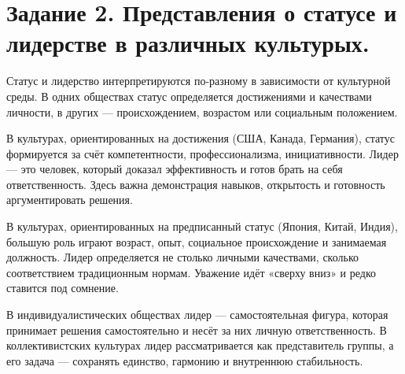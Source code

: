 \documentclass[14pt,a4paper]{extarticle}
\begin{document}
\section{Задание 2. Представления о статусе и лидерстве в различных культурых.}
\begin{sloppypar}
Статус и лидерство интерпретируются по-разному в зависимости от культурной
    среды. В одних обществах статус определяется достижениями и качествами
    личности, в других — происхождением, возрастом или социальным положением.

    В культурах, ориентированных на достижения (США, Канада, Германия), статус
    формируется за счёт компетентности, профессионализма, инициативности. Лидер
    — это человек, который доказал эффективность и готов брать на себя
    ответственность. Здесь важна демонстрация навыков, открытость и готовность
    аргументировать решения.

    В культурах, ориентированных на предписанный статус (Япония, Китай, Индия),
    большую роль играют возраст, опыт, социальное происхождение и занимаемая
    должность. Лидер определяется не столько личными качествами, сколько
    соответствием традиционным нормам. Уважение идёт «сверху вниз» и редко
    ставится под сомнение.

    В индивидуалистических обществах лидер — самостоятельная фигура, которая
    принимает решения самостоятельно и несёт за них личную ответственность. В
    коллективистских культурах лидер рассматривается как представитель группы,
    а его задача — сохранять единство, гармонию и внутреннюю стабильность.
\end{sloppypar}
\end{document}
